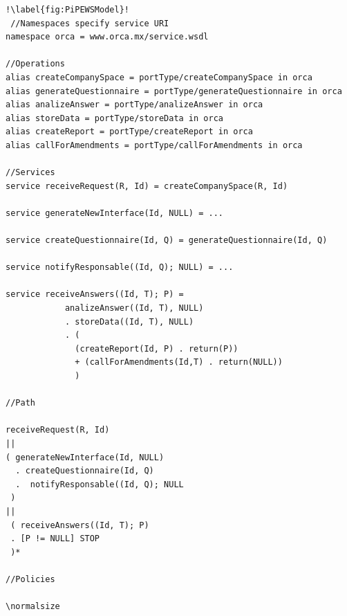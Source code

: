 \begin{lstlisting}[label=list:flyingPigPiPEWS,caption=pi-PEWS
Specification: FlyingPig. ]!\label{fig:PiPEWSModel}!
 //Namespaces specify service URI
namespace orca = www.orca.mx/service.wsdl

//Operations
alias createCompanySpace = portType/createCompanySpace in orca
alias generateQuestionnaire = portType/generateQuestionnaire in orca
alias analizeAnswer = portType/analizeAnswer in orca
alias storeData = portType/storeData in orca
alias createReport = portType/createReport in orca
alias callForAmendments = portType/callForAmendments in orca

//Services
service receiveRequest(R, Id) = createCompanySpace(R, Id)

service generateNewInterface(Id, NULL) = ...

service createQuestionnaire(Id, Q) = generateQuestionnaire(Id, Q)

service notifyResponsable((Id, Q); NULL) = ...

service receiveAnswers((Id, T); P) =
			analizeAnswer((Id, T), NULL) 
			. storeData((Id, T), NULL)
			. (
			  (createReport(Id, P) . return(P))
			  + (callForAmendments(Id,T) . return(NULL))
			  )
  
//Path

receiveRequest(R, Id)
||
( generateNewInterface(Id, NULL)
  . createQuestionnaire(Id, Q)
  .  notifyResponsable((Id, Q); NULL
 )
||
 ( receiveAnswers((Id, T); P)
 . [P != NULL] STOP
 )*	
 
//Policies 					  

\normalsize
\end{lstlisting}
%


